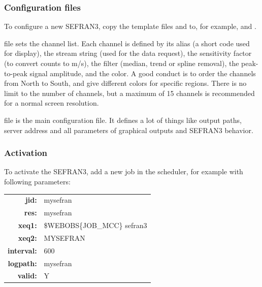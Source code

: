 \subsubsection{Configuration files}

To configure a new SEFRAN3, copy the template files  and  to, for example,  and .


 file sets the channel list. Each channel is defined by its alias (a short code used for display), the stream string (used for the data request), the sensitivity factor (to convert counts to m/s), the filter (median, trend or spline removal), the peak-to-peak signal amplitude, and the color. A good conduct is to order the channels from North to South, and give different colors for specific regions. There is no limit to the number of channels, but a maximum of 15 channels is recommended for a normal screen resolution.

 file is the main configuration file. It defines a lot of things like output paths, server address and all parameters of graphical outputs and SEFRAN3 behavior.






\subsubsection{Activation}

To activate the SEFRAN3, add a new job in the scheduler, for example with following parameters:

\begin{tabular}{rl}
\textbf{jid:}      & mysefran \\
\textbf{res:}      & mysefran \\
\textbf{xeq1:}     & \$WEBOBS\{JOB\_MCC\} sefran3 \\
\textbf{xeq2:}     & MYSEFRAN \\
\textbf{interval:} & 600 \\
\textbf{logpath:}  & mysefran \\
\textbf{valid:}    & Y \\
\end{tabular}

